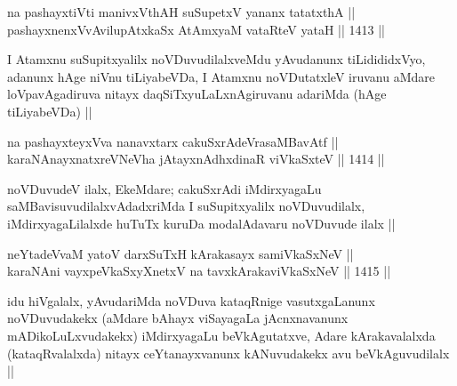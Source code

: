 
\begin{shl}
na pashayxtiVti manivxVthAH suSupetxV yananx tatatxthA ||  \\
pashayxnenxVvAvilupAtxkaSx AtAmx\s yaM vataRteV yataH ||  1413 ||  
\end{shl}

\begin{artha}
I Atamxnu suSupitxyalilx noVDuvudilalxveMdu yAvudanunx tiLidididxVyo, adanunx hAge niVnu tiLiyabeVDa, I Atamxnu noVDutatxleV iruvanu aMdare loVpavAgadiruva nitayx daqSiTxyuLaLxnAgiruvanu adariMda (hAge tiLiyabeVDa) ||
\end{artha}

 
\begin{shl}
na pashayxteyxVva nanavxtarx cakuSxrAdeVrasaMBavAtf || \\
karaNAnayxnatxreVNeVha jAtayxnAdhxdinaR viVkaSxteV ||  1414 ||  
\end{shl}
 
\begin{artha}
noVDuvudeV ilalx, EkeMdare; cakuSxrAdi iMdirxyagaLu saMBavisuvudilalxvAdadxriMda I suSupitxyalilx noVDuvudilalx, iMdirxyagaLilalxde huTuTx kuruDa modalAdavaru noVDuvude ilalx ||
\end{artha}


\begin{shl}
neYtadeVvaM yatoV darxSuTxH kArakasayx samiVkaSxNeV || \\
karaNAni vayxpeVkaSxyXnetxV na tavxkArakaviVkaSxNeV ||  1415 || 
\end{shl}

\begin{artha}
idu hiVgalalx, yAvudariMda noVDuva kataqRnige vasutxgaLanunx noVDuvudakekx (aMdare bAhayx viSayagaLa jAcnxnavanunx mADikoLuLxvudakekx) iMdirxyagaLu beVkAgutatxve, Adare kArakavalalxda (kataqRvalalxda) nitayx ceYtanayxvanunx kANuvudakekx avu beVkAguvudilalx ||
\end{artha}
